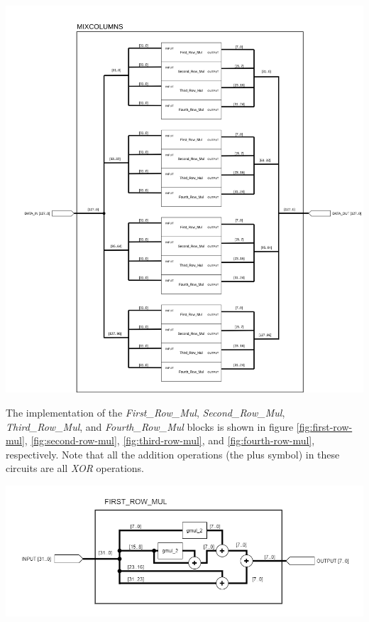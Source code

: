 \documentclass[a4paper, 10pt]{article}
\newenvironment{Figure}
    {\par\medskip\noindent\minipage{\linewidth}}
    {\endminipage\par\medskip}
\begin{document}
\begin{multicols}{2}
            \noindent
            \begin{Figure}
                \centering
                \includegraphics[width=\linewidth]{MixColumns.png}
                \label{fig:mixcolumns}
            \end{Figure}

            The implementation of the \textit{First\_Row\_Mul}, \textit{Second\_Row\_Mul}, \textit{Third\_Row\_Mul}, and \textit{Fourth\_Row\_Mul} blocks is shown in figure \ref{fig:first-row-mul}, \ref{fig:second-row-mul}, \ref{fig:third-row-mul}, and \ref{fig:fourth-row-mul}, respectively. Note that all the addition operations (the plus symbol) in these circuits are all \textit{XOR} operations.

            \noindent
            \begin{Figure}
                \centering
                \includegraphics[width=\linewidth]{First_Row_Mul.png}
                \label{fig:first-row-mul}
            \end{Figure}


\end{multicols}
\end{document}

